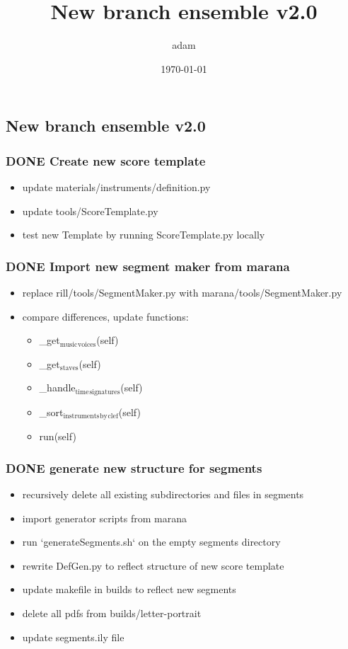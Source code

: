 \documentclass[11pt]{article}
\author{adam}
\date{\today}
\title{New branch ensemble v2.0}
\begin{document}
\maketitle
\subsection*{New branch ensemble v2.0}
\label{sec:org7539c0c}

\subsubsection*{{\bfseries\sffamily DONE} Create new score template}
\label{sec:org2f8d4b2}
\begin{itemize}
\item update materials/instruments/definition.py
\item update tools/ScoreTemplate.py
\item test new Template by running ScoreTemplate.py locally
\end{itemize}

\subsubsection*{{\bfseries\sffamily DONE} Import new segment maker from marana}
\label{sec:org9dbada3}
\begin{itemize}
\item replace rill/tools/SegmentMaker.py with marana/tools/SegmentMaker.py
\item compare differences, update functions:
\begin{itemize}
\item \_get\(_{\text{music}}\)\(_{\text{voices}}\)(self)
\item \_get\(_{\text{staves}}\)(self)
\item \_handle\(_{\text{time}}\)\(_{\text{signatures}}\)(self)
\item \_sort\(_{\text{instruments}}\)\(_{\text{by}}\)\(_{\text{clef}}\)(self)
\item run(self)
\end{itemize}
\end{itemize}

\subsubsection*{{\bfseries\sffamily DONE} generate new structure for segments}
\label{sec:org807e2cd}
\begin{itemize}
\item recursively delete all existing subdirectories and files in segments
\item import generator scripts from marana
\item run `generateSegments.sh` on the empty segments directory
\item rewrite DefGen.py to reflect structure of new score template
\item update makefile in builds to reflect new segments
\item delete all pdfs from builds/letter-portrait
\item update segments.ily file
\end{itemize}
\end{document}
